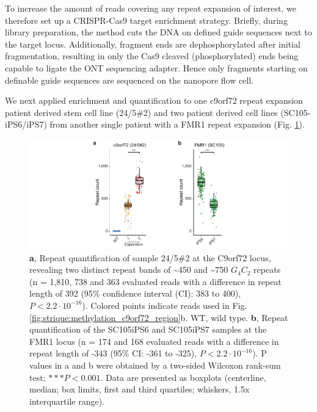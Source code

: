 To increase the amount of reads covering any repeat expansion of interest, we therefore set up a CRISPR-Cas9 target enrichment strategy. Briefly, during library preparation, the method cuts the DNA on defined guide sequences next to the target locus. Additionally, fragment ends are dephosphorylated after initial fragmentation, resulting in only the Cas9 cleaved (phosphorylated) ends being capable to ligate the ONT sequencing adapter. Hence only fragments starting on definable guide sequences are sequenced on the nanopore flow cell.

We next applied enrichment and quantification to one c9orf72 repeat expansion patient derived stem cell line (24/5\#2) and two patient derived cell lines (SC105-iPS6/iPS7) from another single patient with a FMR1 repeat expansion (Fig. \ref{fig:strique:count_patients}).


\begin{figure}[h]
    \centering
    \includegraphics[width=1.0\textwidth]{figures/strique/count_patient_samples.pdf}
    \captionsetup{format=plain}
    \caption[Repeat quantification in c9orf72 and FMR1 patients]{\textbf{a}, Repeat quantification of sample 24/5\#2 at the C9orf72 locus, revealing two distinct repeat bands of \textasciitilde450 and \textasciitilde750 $ G_{4}C_{2} $ repeats (n = 1,810, 738 and 363 evaluated reads with a difference in repeat length of 392 (95\% confidence interval (CI): 383 to 400), $ P < 2.2 \cdot 10^{-16} $). Colored points indicate reads used in Fig. \ref{fig:strique:methylation_c9orf72_region}b. WT, wild type. \textbf{b}, Repeat quantification of the SC105iPS6 and SC105iPS7 samples at the FMR1 locus (n = 174 and 168 evaluated reads with a difference in repeat length of -343 (95\% CI: -361 to -325), $ P < 2.2 \cdot 10^{-16} $). P values in a and b were obtained by a two-sided Wilcoxon rank-sum test; $ ***P < 0.001 $. Data are presented as boxplots (centerline, median; box limits, first and third quartiles; whiskers, 1.5x interquartile range).}
    \label{fig:strique:count_patients}
\end{figure}

